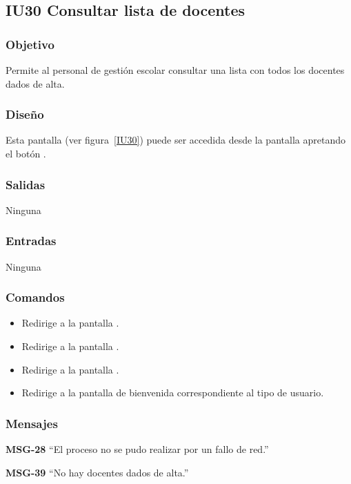 
\subsection{IU30 Consultar lista de docentes}
\subsubsection{Objetivo}
   Permite al personal de gestión escolar consultar una lista con todos los docentes dados de alta.
\subsubsection{Diseño}
    Esta pantalla  (ver figura~\ref{IU30}) puede ser accedida desde la pantalla  apretando el botón .

\subsubsection{Salidas}
Ninguna
\subsubsection{Entradas}
Ninguna
\subsubsection{Comandos}
\begin{itemize}
    \item {} Redirige a la pantalla .
    \item {} Redirige a la pantalla .
    \item {} Redirige a la pantalla .
    \item {} Redirige a la pantalla de bienvenida correspondiente al tipo de usuario.
    
\end{itemize}

\subsubsection{Mensajes}

\begin{Citemize}
    \item {\bf MSG-28}  ``El proceso no se pudo realizar por un fallo de red.''
    \item {\bf MSG-39}  ``No hay docentes dados de alta.''
\end{Citemize}


